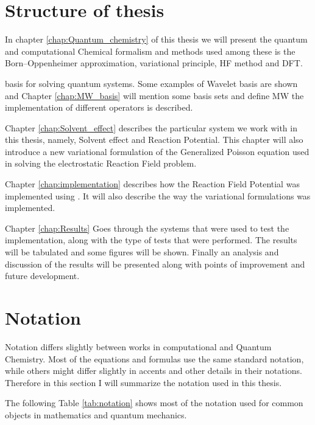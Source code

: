 \documentclass[../master_thesis.tex]{subfiles}
\begin{document}
\section{Structure of thesis}
In chapter \ref{chap:Quantum_chemistry} of this thesis we will present the quantum
and computational Chemical formalism and methods used among these is the
Born--Oppenheimer approximation, variational principle, \ac{HF} method and
\ac{DFT}.

basis for solving quantum systems. Some examples of Wavelet basis are shown and
Chapter \ref{chap:MW_basis} will mention some basis sets and define \ac{MW}
the implementation of different operators is described.

Chapter \ref{chap:Solvent_effect}
describes the particular system we work with in this thesis, namely, Solvent
effect and Reaction Potential. This chapter will also introduce a new variational
formulation of the Generalized Poisson equation used in solving the electrostatic
Reaction Field problem.

Chapter \ref{chap:implementation} describes how the Reaction Field Potential was implemented
using \mrchem. It will also describe the way the variational formulations was implemented.

Chapter \ref{chap:Results} Goes through the systems that were used to test the implementation,
along with the type of tests that were performed. The results will be tabulated and
some figures will be shown. Finally an analysis and discussion of the results will be
presented along with points of improvement and future development.
\section{Notation}
Notation differs slightly between works in computational and Quantum Chemistry.
Most of the equations and formulas use the same standard notation, while others
might differ slightly in accents and other details in their notations. Therefore
in this section I will summarize the notation used in this thesis.

The following Table \ref{tab:notation} shows most of the notation used for
common objects in mathematics and quantum mechanics.
\end{document}
